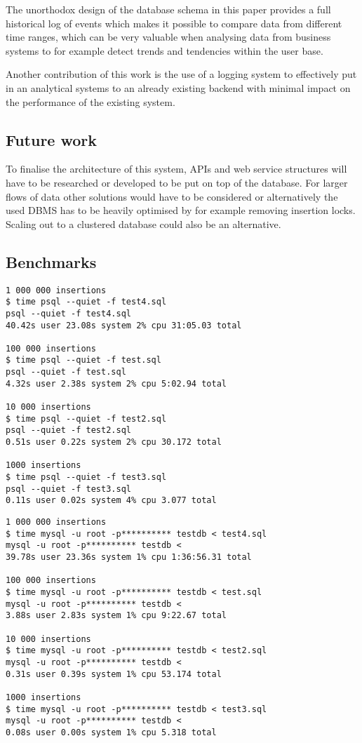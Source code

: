 \documentclass[a4paper,12pt]{article}
\begin{document}
The unorthodox design of the database schema in this paper provides a full historical log of events which makes it possible to compare data from different time ranges, 
which can be very valuable when analysing data from business systems to for example detect trends and tendencies within the user base. 

Another contribution of this work is the use of a logging system to effectively put in an analytical systems 
to an already existing backend with minimal impact on the performance of the existing system. 

\subsection{Future work}
To finalise the architecture of this system, APIs and web service structures will have to be researched or developed to be put on top of the database. For larger flows of data other solutions would have 
to be considered or alternatively the used DBMS has to be heavily optimised by for example removing insertion locks. Scaling out to a clustered database could also be an alternative.

\newpage
{}
\begin{appendices}
\section{Benchmarks}
\label{appendix:a}
\begin{lstlisting}[label=some-code,caption=PostgreSQL insertion test]
1 000 000 insertions
$ time psql --quiet -f test4.sql
psql --quiet -f test4.sql
40.42s user 23.08s system 2% cpu 31:05.03 total

100 000 insertions
$ time psql --quiet -f test.sql
psql --quiet -f test.sql
4.32s user 2.38s system 2% cpu 5:02.94 total

10 000 insertions
$ time psql --quiet -f test2.sql
psql --quiet -f test2.sql
0.51s user 0.22s system 2% cpu 30.172 total

1000 insertions
$ time psql --quiet -f test3.sql
psql --quiet -f test3.sql 
0.11s user 0.02s system 4% cpu 3.077 total
\end{lstlisting}
\begin{lstlisting}[label=some-code,caption=MySQL insertion test]
1 000 000 insertions
$ time mysql -u root -p********** testdb < test4.sql
mysql -u root -p********** testdb <   
39.78s user 23.36s system 1% cpu 1:36:56.31 total

100 000 insertions
$ time mysql -u root -p********** testdb < test.sql
mysql -u root -p********** testdb < 
3.88s user 2.83s system 1% cpu 9:22.67 total

10 000 insertions
$ time mysql -u root -p********** testdb < test2.sql 
mysql -u root -p********** testdb < 
0.31s user 0.39s system 1% cpu 53.174 total

1000 insertions
$ time mysql -u root -p********** testdb < test3.sql 
mysql -u root -p********** testdb < 
0.08s user 0.00s system 1% cpu 5.318 total
\end{lstlisting}
\end{appendices}
\restoregeometry


\newpage


\end{document}
